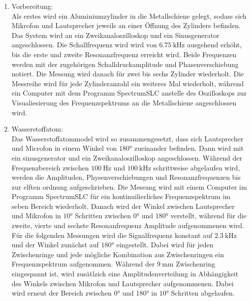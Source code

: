 \begin{enumerate}
    \item Vorbereitung:\\
        Als erstes wird ein Aluminiumzylinder in die Metallschiene gelegt, sodass 
        sich Mikrofon und Lautsprecher jeweils an einer Öffnung des Zylinders befinden.
        Das System wird an ein Zweikanaloszilloskop und ein Sinusgenerator angeschlossen. 
        Die Schallfrequenz wird 
        wird von $\SI{6,75}{\kilo\hertz}$ ausgehend erhöht, bis die erste und 
        zweite Resonanzfrequenz 
        erreicht wird. Beide Frequenzen werden mit der zugehörigen Schalldruckamplitude und 
        Phasenverschiebung notiert. Die Messung wird danach für zwei bis sechs Zylinder 
        wiederholt. Die Messreihe wird für jede Zylinderanzahl ein weiteres Mal wiederholt,
        während ein Computer mit dem Programm SpectrumSLC anstelle des Oszilloskops zur Visualiesierung 
        des Frequenzspektrums an 
        die Metallschiene angeschlossen wird. 
    \item Wasserstoffatom:\\
        Das Wasserstoffatommodel wird so zusammengesetzt, dass sich Lautsprecher und Microfon
        in einem Winkel von $\num{180}°$ zueinander befinden. 
        Dann wird mit ein sinusgenerator und ein Zweikanaloszilloskop angeschlossen. 
        Während der Frequenzbereich zwischen $\SI{100}{\hertz}$ und $\SI{100}{\kilo\hertz}$
        schrittweise abgelaufen wird, werden die Amplituden, Physenverschiebungen und 
        Resonanzfrequenzen bis zur elften ordnung aufgeschrieben. 
        Die Messung wird mit einem Computer im Programm SpectrumSLC für ein 
        kontinuilierliches Frequenzspektrum im seben Bereich wiederholt.
        Danach wird der Winkel zwischen Lautsprecher und Mikrofon in $\num{10}°$
        Schritten zwischen $\num{0}°$ und $\num{180}°$ verstellt, während
        für die zweite, vierte und sechste Resonanfrequenz Amplitude aufgenommenen
        wird.
        Für die folgenden Messungen wird
        die Signalfrequenz konstant auf $\SI{2,3}{\kilo\hertz}$ und der Winkel 
        zunächst auf $\num{180}°$
        eingestellt. Dabei wird für jeden Zwischenringe und jede mögliche Kombination 
        aus Zwischenringen ein Frequenzspektrum aufgenommen.
        Während der $\SI{9}{\milli\meter}$ Zwischenring eingespannt ist, wird zusätlzich 
        eine Amplitudenverteilung in Abhängigkeit des Winkels zwischen Mikrofon und 
        Lautsprecher aufgenommenen. Dabei wird erneut der Bereich zwischen 
        $\num{0}°$ und $\num{180}°$ in $\num{10}°$ Schritten abgelaufen.

\end{enumerate}
